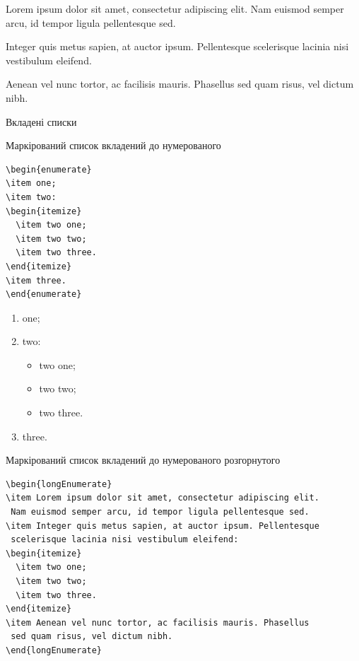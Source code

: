 \begin{longEnumerate}
\item Lorem ipsum dolor sit amet, consectetur adipiscing elit. Nam euismod semper arcu, id tempor ligula pellentesque sed. 
\item Integer quis metus sapien, at auctor ipsum. Pellentesque scelerisque lacinia nisi vestibulum eleifend. 
\item Aenean vel nunc tortor, ac facilisis mauris. Phasellus sed quam risus, vel dictum nibh.
\end{longEnumerate}

Вкладені списки

Маркірований список вкладений до нумерованого

\begin{framed}\small
\begin{lstlisting}
\begin{enumerate}
\item one;
\item two:
\begin{itemize}
  \item two one;
  \item two two;
  \item two three.
\end{itemize}
\item three.
\end{enumerate}
\end{lstlisting}
\end{framed}

\begin{enumerate}
\item one;
\item two:
\begin{itemize}
  \item two one;
  \item two two;
  \item two three.
\end{itemize}
\item three.
\end{enumerate}

Маркірований список вкладений до нумерованого розгорнутого

\begin{framed}\small
\begin{lstlisting}
\begin{longEnumerate}
\item Lorem ipsum dolor sit amet, consectetur adipiscing elit.
 Nam euismod semper arcu, id tempor ligula pellentesque sed.
\item Integer quis metus sapien, at auctor ipsum. Pellentesque
 scelerisque lacinia nisi vestibulum eleifend:
\begin{itemize}
  \item two one;
  \item two two;
  \item two three.
\end{itemize}
\item Aenean vel nunc tortor, ac facilisis mauris. Phasellus
 sed quam risus, vel dictum nibh.
\end{longEnumerate}
\end{lstlisting}
\end{framed}

